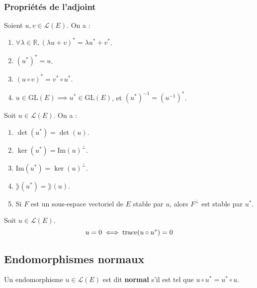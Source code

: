 	\subsubsection{Propriétés de l'adjoint}


	\begin{proposition}
		\label{158-1}
		Soient $u, v \in \mathcal{L}(E)$. On a :
		\begin{enumerate}[label=(\roman*)]
			\item $\forall \lambda \in \mathbb{R}, (\lambda u + v)^* = \lambda u^* + v^*$.
			\item $(u^*)^* = u$.
			\item $(u \circ v)^* = v^* \circ u^*$.
			\item $u \in \mathrm{GL}(E) \implies u^* \in \mathrm{GL}(E)$, et $(u^*)^{-1} = (u^{-1})^*$.
		\end{enumerate}
	\end{proposition}

	\begin{proposition}
		Soit $u \in \mathcal{L}(E)$. On a :
		\begin{enumerate}[label=(\roman*)]
			\item $\det(u^*) = \det(u)$.
			\item $\ker(u^*) = \mathrm{Im}(u)^\perp$.
			\item $\mathrm{Im}(u^*) = \ker(u)^\perp$.
			\item $\rang(u^*) = \rang(u)$.
			\item Si $F$ est un sous-espace vectoriel de $E$ stable par $u$, alors $F^\perp$ est stable par $u^*$.
		\end{enumerate}
	\end{proposition}


	\begin{proposition}
		Soit $u \in \mathcal{L}(E)$.
		\[ u = 0 \iff \operatorname{trace}(u \circ u^*) = 0 \]
	\end{proposition}

	\subsection{Endomorphismes normaux}


	\begin{definition}
		Un endomorphisme $u \in \mathcal{L}(E)$ est dit \textbf{normal} s'il est tel que $u \circ u^* = u^* \circ u$.
	\end{definition}

